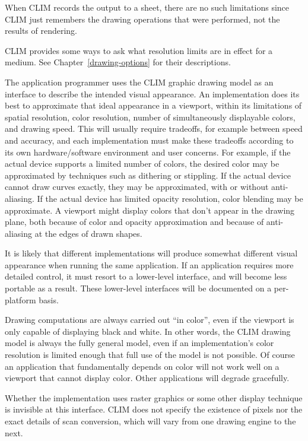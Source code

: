 When CLIM records the output to a sheet, there are no such limitations since
CLIM just remembers the drawing operations that were performed, not the results
of rendering.

CLIM provides some ways to ask what resolution limits are in effect for a
medium.  See Chapter~\ref{drawing-options} for their descriptions.

The application programmer uses the CLIM graphic drawing model as an interface
to describe the intended visual appearance.  An implementation does its best to
approximate that ideal appearance in a viewport, within its limitations of
spatial resolution, color resolution, number of simultaneously displayable
colors, and drawing speed.  This will usually require tradeoffs, for example
between speed and accuracy, and each implementation must make these tradeoffs
according to its own hardware/software environment and user concerns.  For
example, if the actual device supports a limited number of colors, the desired
color may be approximated by techniques such as dithering or stippling.  If the
actual device cannot draw curves exactly, they may be approximated, with or
without anti-aliasing.  If the actual device has limited opacity resolution,
color blending may be approximate.  A viewport might display colors that don't
appear in the drawing plane, both because of color and opacity approximation and
because of anti-aliasing at the edges of drawn shapes.

It is likely that different implementations will produce somewhat different
visual appearance when running the same application.  If an application requires
more detailed control, it must resort to a lower-level interface, and will
become less portable as a result.  These lower-level interfaces will be
documented on a per-platform basis.

Drawing computations are always carried out ``in color'', even if the viewport
is only capable of displaying black and white.  In other words, the CLIM drawing
model is always the fully general model, even if an implementation's color
resolution is limited enough that full use of the model is not possible.  Of
course an application that fundamentally depends on color will not work well on
a viewport that cannot display color.  Other applications will degrade
gracefully.

Whether the implementation uses raster graphics or some other display technique
is invisible at this interface.  CLIM does not specify the existence of pixels
nor the exact details of scan conversion, which will vary from one drawing
engine to the next.

